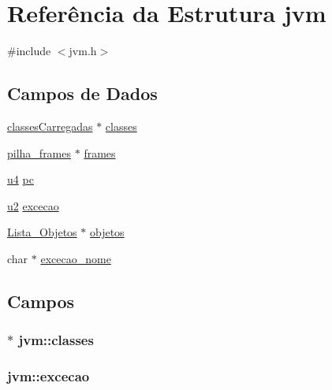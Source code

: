 \hypertarget{structjvm}{}\section{Referência da Estrutura jvm}
\label{structjvm}


{\ttfamily \#include $<$jvm.\+h$>$}

\subsection*{Campos de Dados}
\begin{DoxyCompactItemize}
\item 
\hyperlink{structclassesCarregadas}{classes\+Carregadas} $\ast$ \hyperlink{structjvm_a43783d4b1817816cccc62a08154190f6}{classes}
\item 
\hyperlink{structpilha__frames}{pilha\+\_\+frames} $\ast$ \hyperlink{structjvm_a4277814c8cb94f0e77f09428d3d668b9}{frames}
\item 
\hyperlink{lista__operandos_8h_ae5be1f726785414dd1b77d60df074c9d}{u4} \hyperlink{structjvm_ac879eb42576afb2256646f478a7f68c2}{pc}
\item 
\hyperlink{lista__operandos_8h_a732cde1300aafb73b0ea6c2558a7a54f}{u2} \hyperlink{structjvm_a9a1827338d5d118644ec0a72a76a5d89}{excecao}
\item 
\hyperlink{jvm_8h_a44d196f61b6d8bad019106cbc5da18d0}{Lista\+\_\+\+Objetos} $\ast$ \hyperlink{structjvm_a4a51ef7b7c771d7f86a22b4d869ac430}{objetos}
\item 
char $\ast$ \hyperlink{structjvm_a471ac752db9424623227c661b194399b}{excecao\+\_\+nome}
\end{DoxyCompactItemize}


\subsection{Campos}
\subsubsection[{\texorpdfstring{classes}{classes}}]{$\ast$ jvm\+::classes}\hypertarget{structjvm_a43783d4b1817816cccc62a08154190f6}{}\label{structjvm_a43783d4b1817816cccc62a08154190f6}
\subsubsection[{\texorpdfstring{excecao}{excecao}}]{ jvm\+::excecao}\hypertarget{structjvm_a9a1827338d5d118644ec0a72a76a5d89}{}\label{structjvm_a9a1827338d5d118644ec0a72a76a5d89}
